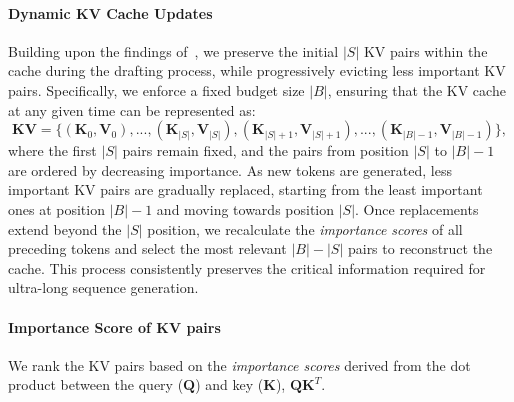 \paragraph{Dynamic KV Cache Updates}
Building upon the findings of~\citet{stram_llm}, we preserve the initial $|S|$ KV pairs within the cache during the drafting process, while progressively evicting less important KV pairs. Specifically, we enforce a fixed budget size $|B|$, ensuring that the KV cache at any given time can be represented as:
\begin{equation}
    \nonumber
    \mathbf{KV}=\{(\mathbf{K}_0,\mathbf{V}_0), ..., (\mathbf{K}_{|S|},\mathbf{V}_{|S|}), (\mathbf{K}_{|S|+1},\mathbf{V}_{|S|+1}),..., (\mathbf{K}_{|B|-1},\mathbf{V}_{|B|-1})\},
\end{equation}
where the first $|S|$ pairs remain fixed, and the pairs from position $|S|$ to $|B|-1$ are ordered by decreasing importance. 
As new tokens are generated, less important KV pairs are gradually replaced, starting from the least important ones at position $|B|-1$ and moving towards position $|S|$. Once replacements extend beyond the $|S|$ position, we recalculate the \textit{importance scores} of all preceding tokens and select the most relevant $|B|-|S|$ pairs to reconstruct the cache. 
This process consistently preserves the critical information required for ultra-long sequence generation. 
\vspace{-0.05 in}
\paragraph{Importance Score of KV pairs} 
We rank the KV pairs based on the \textit{importance scores} derived from the dot product between the query ($\mathbf{Q}$) and key ($\mathbf{K}$), \ie $\mathbf{Q}\mathbf{K}^T$. 

